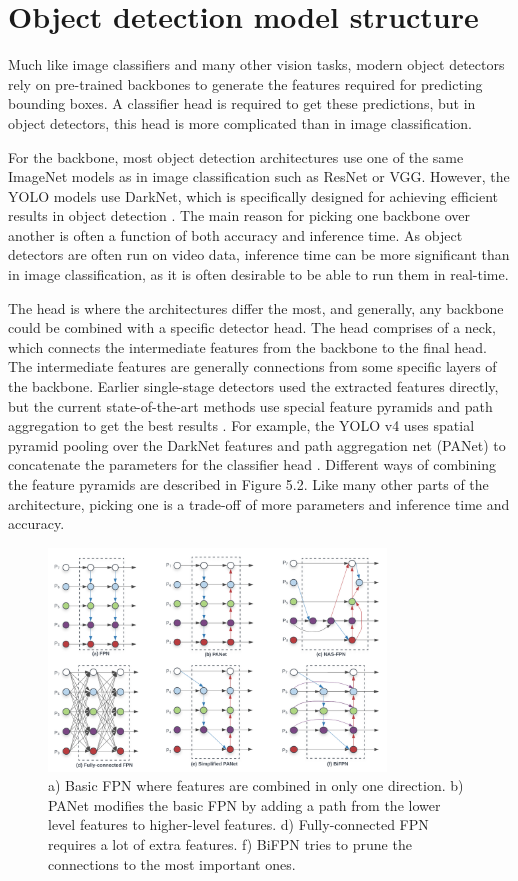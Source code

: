 \section{Object detection model structure}
Much like image classifiers and many other vision tasks, modern object detectors rely on pre-trained backbones to generate the features required for predicting bounding boxes.
A classifier head is required to get these predictions, but in object detectors, this head is more complicated than in image classification.

For the backbone, most object detection architectures use one of the same ImageNet models as in image classification such as ResNet or VGG.
However, the YOLO models use DarkNet, which is specifically designed for achieving efficient results in object detection \citep{yolov4}.
The main reason for picking one backbone over another is often a function of both accuracy and inference time.
As object detectors are often run on video data, inference time can be more significant than in image classification, as it is often desirable to be able to run them in real-time.

The head is where the architectures differ the most, and generally, any backbone could be combined with a specific detector head.
The head comprises of a neck, which connects the intermediate features from the backbone to the final head.
The intermediate features are generally connections from some specific layers of the backbone.
Earlier single-stage detectors used the extracted features directly, but the current state-of-the-art methods use special feature pyramids and path aggregation to get the best results \citep{efficientDet}.
For example, the YOLO v4 uses spatial pyramid pooling \citep{SPP} over the DarkNet features and path aggregation net (PANet) \citep{PANET} to concatenate the parameters for the classifier head \citep{yolov4}.
Different ways of combining the feature pyramids are described in Figure 5.2.
Like many other parts of the architecture, picking one is a trade-off of more parameters and inference time and accuracy.
\begin{figure}[h!]
    \centering
    \includegraphics[width=0.8\textwidth]{imgs/detector_necks.png}
    \caption{a) Basic FPN \citep{FPN} where features are combined in only one direction. b) PANet modifies the basic FPN by adding a path from the lower level features to higher-level features. d) Fully-connected FPN requires a lot of extra features. f) BiFPN tries to prune the connections to the most important ones.}
\end{figure}

